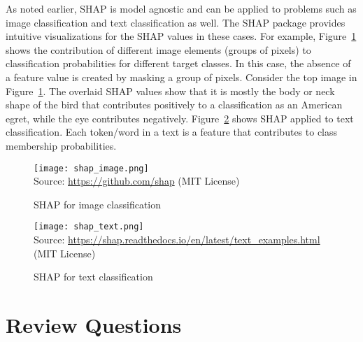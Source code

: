 As noted earlier, SHAP is model agnostic and can be applied to problems such as image classification and text classification as well. The SHAP package provides intuitive visualizations for the SHAP values in these cases. For example, Figure~\ref{fig:shapimage} shows the contribution of different image elements (groups of pixels) to classification probabilities for different target classes. In this case, the absence of a feature value is created by masking a group of pixels. Consider the top image in Figure~\ref{fig:shapimage}. The overlaid SHAP values show that it is mostly the body or neck shape of the bird that contributes positively to a classification as an American egret, while the eye contributes negatively. Figure~\ref{fig:shaptext} shows SHAP applied to text classification. Each token/word in a text is a feature that contributes to class membership probabilities.  

\begin{figure}
\centering

\texttt{[image: shap\_image.png]} \\

\scriptsize Source: \url{https://github.com/shap} (MIT License)
\caption{SHAP for image classification}
\label{fig:shapimage}
\end{figure}

\begin{figure}
\centering

\texttt{[image: shap\_text.png]} \\

\scriptsize Source: \url{https://shap.readthedocs.io/en/latest/text_examples.html} (MIT License)
\caption{SHAP for text classification}
\label{fig:shaptext}
\end{figure}

\FloatBarrier
\section{Review Questions}
